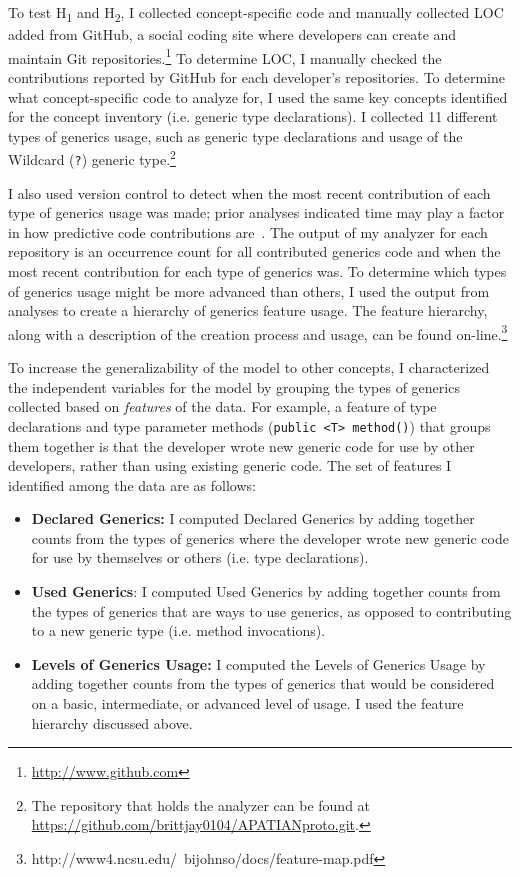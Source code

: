 \documentclass{llncs}
\begin{document}
To test H\textsubscript{1} and H\textsubscript{2}, I collected concept-specific code and manually collected LOC added from GitHub, a social coding site where developers can create and maintain Git repositories.\footnote{\url{http://www.github.com}} To determine LOC, I manually checked the contributions reported by GitHub for each developer's repositories. To determine what concept-specific code to analyze for, I used the same key concepts identified for the concept inventory (i.e. generic type declarations). I collected 11 different types of generics usage, such as generic type declarations and usage of the Wildcard (\texttt{?}) generic type.\footnote{The repository that holds the analyzer can be found at \url{https://github.com/brittjay0104/APATIANproto.git}.}

I also used version control to detect when the most recent contribution of each type of generics usage was made; prior analyses indicated time may play a factor in how predictive code contributions are~\cite{johnson2015bespoke}.
The output of my analyzer for each repository is an occurrence count for all contributed generics code and when the most recent contribution for each type of generics was.
To determine which types of generics usage might be more advanced than others, I used the output from analyses to create a hierarchy of generics feature usage. The feature hierarchy, along with a description of the creation process and usage, can be found on-line.\footnote{http://www4.ncsu.edu/~bijohnso/docs/feature-map.pdf}

To increase the generalizability of the model to other concepts, I characterized the independent variables for the model by grouping the types of generics collected based on \emph{features} of the data. For example, a feature of type declarations and type parameter methods (\texttt{public <T> method()}) that groups them together is that the developer wrote new generic code for use by other developers, rather than using existing generic code.
The set of features I identified among the data are as follows:
\begin{itemize}
	\item \textbf{Declared Generics:} I computed Declared Generics by adding together counts from the types of generics where the developer wrote new generic code for use by themselves or others (i.e. type declarations).
	\item \textbf{Used Generics}: I computed Used Generics by adding together counts from the types of generics that are ways to use generics, as opposed to contributing to a new generic type (i.e. method invocations).
	\item \textbf{Levels of Generics Usage:} I computed the Levels of Generics Usage by adding together counts from the types of generics that would be considered on a basic, intermediate, or advanced level of usage. I used the feature hierarchy discussed above. 
\end{itemize}
\end{document}
